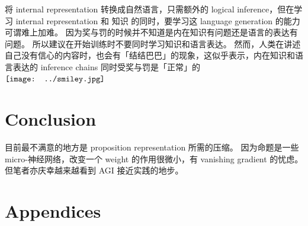 \documentclass[orivec]{article}
\newcommand{\cc}[2]{#1}
\newcommand{\cc}[2]{#2}
\newcommand*\sigmoid{\vcenter{\hbox{\texttt{[image: ../sigmoid.png]}}}}
\newcommand*\smiley{\vcenter{\hbox{\texttt{[image: ../smiley.jpg]}}}}
\begin{document}
\cc{
将 internal representation 转换成自然语言，只需额外的 logical inference，但在学习 internal representation 和 知识 的同时，要学习这 language generation 的能力可谓难上加难。  因为奖与罚的时候并不知道是内在知识有问题还是语言的表达有问题。 所以建议在开始训练时不要同时学习知识和语言表达。  然而，人类在讲述自己没有信心的内容时，也会有「结结巴巴」的现象，这似乎表示，内在知识和语言表达的 inference chains 同时受奖与罚是「正常」的 $\smiley$}{
To generate natural language from internal representations, we only need additional logical inference.  However, to learn language generation while learning the internal representation and knowledge at the same time might be too difficult, so we would advice against trying these as first experiments.  However, even for humans, talking about things that one is not confident about, often results in stammering and other speech disturbances.  This may be evidence that rewarding / punishing the inference chains for language and for real knowledge at the same time, may be ``normal'' $\smiley$
}

\section{Conclusion}

\cc{
目前最不满意的地方是 proposition representation 所需的压缩。  因为命题是一些 micro-神经网络，改变一个 weight 的作用很微小，有 vanishing gradient 的忧虑。  但笔者亦庆幸越来越看到 AGI 接近实践的地步。}{
One thing we are not satisfied with is the need for compression of the proposition representation.  Representing a proposition as a micro-NN, changing its weights may have very small and indirect effects, thus the vanishing gradient is a worry.  But I am glad to see the goal of AGI getting more and more achievable.
}

\appendix
\section*{Appendices}
\renewcommand{\thesubsection}{\Alph{subsection}}
\end{document}
